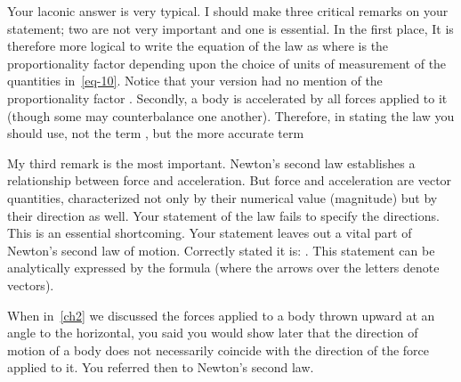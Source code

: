 \begin{p}
Your laconic answer is very typical. I should make three critical remarks on your statement; two are not very important and one is essential. In the first place,  It is therefore more logical to write the equation of the law as
where  is the proportionality factor depending upon the choice of units of measurement of the quantities in~\cref{eq-10}. Notice that your version had no mention of the proportionality factor . Secondly, a body is accelerated by all forces applied to it (though some may counterbalance one another). Therefore, in stating the law you should use, not the term , but the more accurate term 

My third remark is the most important. Newton's second law establishes a relationship between force and acceleration. But force and acceleration are vector quantities, characterized not only by their numerical value (magnitude) but by their direction as well. Your statement of the law fails to specify the directions. This is an essential shortcoming. Your statement leaves out a vital part of Newton's second law of motion. Correctly stated it is: . This statement can be analytically expressed by the formula
(where the arrows over the letters denote vectors).
\end{p}




\begin{s}
When in~\cref{ch2} we discussed the forces applied to a body thrown upward at an angle to the horizontal, you said you would show later that the direction of motion of a body does not necessarily coincide with the direction of the force applied to it. You referred then to Newton's second law.
\end{s}



